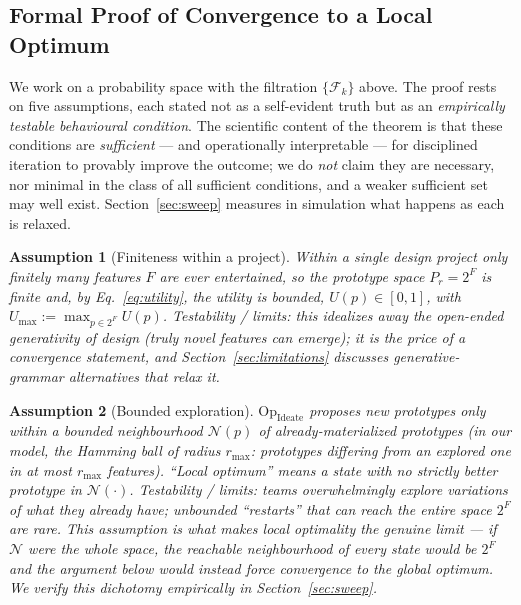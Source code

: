 \documentclass[11pt]{article}
\newtheorem{assumption}{Assumption}
\newcommand{\filt}{\mathcal{F}}     %
\newcommand{\Op}[1]{\mathrm{Op}_{\mathrm{#1}}}
\begin{document}
\subsection{Formal Proof of Convergence to a Local Optimum}
\label{sec:proof}

We work on a probability space with the filtration $\{\filt_k\}$ above. The proof rests on five assumptions, each stated not as a self-evident truth but as an \emph{empirically testable behavioural condition}. The scientific content of the theorem is that these conditions are \emph{sufficient} --- and operationally interpretable --- for disciplined iteration to provably improve the outcome; we do \emph{not} claim they are necessary, nor minimal in the class of all sufficient conditions, and a weaker sufficient set may well exist. Section~\ref{sec:sweep} measures in simulation what happens as each is relaxed.

\begin{assumption}[Finiteness within a project]
\label{as:finite}
Within a single design project only finitely many features $F$ are ever entertained, so the prototype space $P_r = 2^F$ is finite and, by Eq.~\eqref{eq:utility}, the utility is bounded, $U(p)\in[0,1]$, with $U_{\max}:=\max_{p\in 2^F} U(p)$. \emph{Testability / limits:} this idealizes away the open-ended generativity of design (truly novel features can emerge); it is the price of a convergence statement, and Section~\ref{sec:limitations} discusses generative-grammar alternatives that relax it.
\end{assumption}

\begin{assumption}[Bounded exploration]
\label{as:bounded}
$\Op{Ideate}$ proposes new prototypes only within a bounded neighbourhood $\mathcal{N}(p)$ of already-materialized prototypes (in our model, the Hamming ball of radius $r_{\max}$: prototypes differing from an explored one in at most $r_{\max}$ features). ``Local optimum'' means a state with no strictly better prototype in $\mathcal{N}(\cdot)$. \emph{Testability / limits:} teams overwhelmingly explore variations of what they already have; unbounded ``restarts'' that can reach the entire space $2^F$ are rare. This assumption is what makes \emph{local} optimality the genuine limit --- if $\mathcal{N}$ were the whole space, the reachable neighbourhood of every state would be $2^F$ and the argument below would instead force convergence to the \emph{global} optimum. We verify this dichotomy empirically in Section~\ref{sec:sweep}.
\end{assumption}
\end{document}

